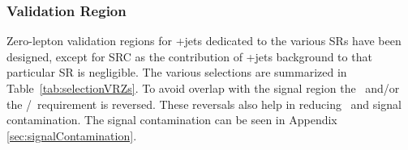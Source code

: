 \subsubsection{Validation Region}

Zero-lepton validation regions for \Zboson +jets dedicated to the various SRs have
been designed, except for SRC as the contribution of \Zboson +jets background to that particular SR is negligible. The various selections are summarized in Table~\ref{tab:selectionVRZs}. To avoid overlap with the signal region the \drbjetbjet\ and/or the \mantikttwelvezero/\mantikteightzero\ requirement is reversed. These reversals also help in reducing \ttbar\ and signal contamination.  The signal contamination can be seen in Appendix \ref{sec:signalContamination}.  \\  %

